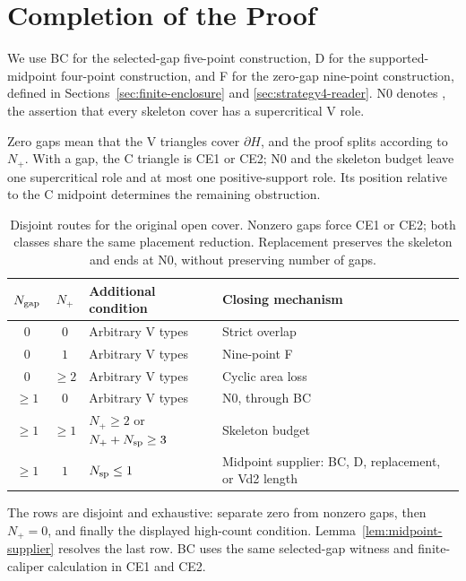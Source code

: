 \section{Completion of the Proof}\label{sec:assembly}

We use BC for the selected-gap five-point construction, D for the supported-
midpoint four-point construction, and F for the zero-gap nine-point
construction, defined in Sections~\ref{sec:finite-enclosure} and
\ref{sec:strategy4-reader}.
N0 denotes , the assertion that every skeleton
cover has a supercritical V role.

Zero gaps mean that the V triangles cover $\partial H$, and the proof
splits according to $N_+$. With a gap, the C triangle is CE1 or CE2;
N0 and the skeleton budget leave one supercritical role and at most one
positive-support role. Its position relative to the C midpoint determines
the remaining obstruction.

\begin{table}[H]
\centering\small
\setlength{\tabcolsep}{5pt}\renewcommand{\arraystretch}{1.15}
\begin{tabular}{@{}ccp{}p{}@{}}
\toprule
$N_{\rm gap}$&$N_+$&Additional condition&Closing mechanism\\
\midrule
$0$&$0$&Arbitrary V types&Strict overlap\\
$0$&$1$&Arbitrary V types&Nine-point F\\
$0$&$\ge2$&Arbitrary V types&Cyclic area loss\\
\midrule
$\ge1$&$0$&Arbitrary V types&N0, through BC\\
$\ge1$&$\ge1$&$N_+\ge2$ or $N_++N_{\rm sp}\ge3$&Skeleton budget\\
$\ge1$&$1$&$N_{\rm sp}\le1$&Midpoint supplier: BC, D, replacement, or Vd2 length\\
\bottomrule
\end{tabular}
\caption{Disjoint routes for the original open cover. Nonzero gaps force
CE1 or CE2; both classes share the same placement reduction. Replacement
preserves the skeleton and ends at N0, without preserving number of gaps.}
\label{tab:routing}
\end{table}

The rows are disjoint and exhaustive: separate zero from nonzero gaps,
then $N_+=0$, and finally the displayed high-count condition.
Lemma~\ref{lem:midpoint-supplier} resolves the last row. BC uses the same
selected-gap witness and finite-caliper calculation in CE1 and CE2.


